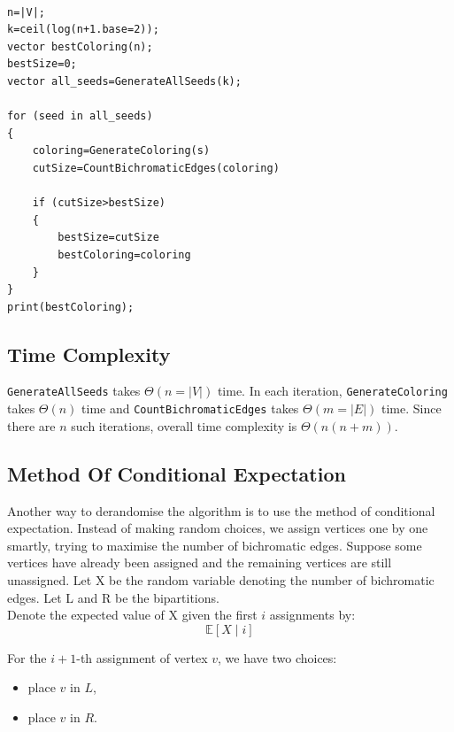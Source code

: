 \begin{center}
\begin{minipage}{0.9\linewidth}
\begin{framed}
\begin{Verbatim}

n=|V|;
k=ceil(log(n+1.base=2));
vector bestColoring(n);
bestSize=0;
vector all_seeds=GenerateAllSeeds(k);

for (seed in all_seeds)
{
    coloring=GenerateColoring(s)
    cutSize=CountBichromaticEdges(coloring)

    if (cutSize>bestSize)
    {
        bestSize=cutSize
        bestColoring=coloring
    }
}
print(bestColoring);
\end{Verbatim}
\vspace{-4mm}
\end{framed}
\end{minipage}
\end{center}

\subsection{Time Complexity}
\texttt{GenerateAllSeeds} takes $\Theta(n=|V|)$ time. In each iteration, \texttt{GenerateColoring} 
takes $\Theta(n)$ time and \texttt{CountBichromaticEdges} takes $\Theta(m=|E|)$ time. Since there are $n$ such iterations, 
overall time complexity is $\Theta(n(n+m))$.


\subsection{Method Of Conditional Expectation}
Another way to derandomise the algorithm is to use the method of conditional expectation. 
Instead of making random choices, we assign vertices one by one smartly, trying to maximise the 
number of bichromatic edges. Suppose some vertices have already been assigned and the remaining vertices are
still unassigned. Let X be the random variable denoting the number of bichromatic edges.
Let L and R be the bipartitions.\\


Denote the expected value of X given the first \(i\) assignments by:
\[
\mathbb E[X \mid i]
\]


For the $i+1$-th assignment of vertex \(v\), we have two choices:
\begin{itemize}
\item place \(v\) in \(L\),
\item place \(v\) in \(R\).
\end{itemize}


